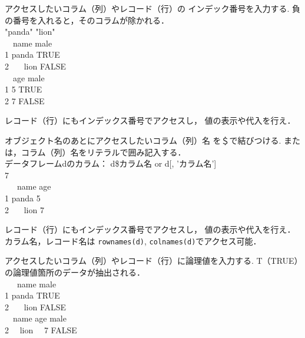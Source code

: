 {
  {
    アクセスしたいコラム（列）やレコード（行）の
    インデック番号を入力する.
    負の番号を入れると，そのコラムが除かれる．
  }
  \MyColsThree
  {
    \MyConsole
    {
      \\ \relax
      [1] "panda" "lion" 
    }
  }
  {
    \MyConsole
    {
      \\ \relax
      ~~name  male\\
      1 panda  TRUE\\
      2 ~~~lion FALSE
    }
  }
  {
    \MyConsole
    {
      \\ \relax
      ~~age  male\\
      1   5  TRUE\\
      2   7 FALSE
    }
  }
}

{
  \MyExercise
  {
    レコード（行）にもインデックス番号でアクセスし，
    値の表示や代入を行え．
  }
}

{
  {
    オブジェクト名のあとにアクセスしたいコラム（列）名
    を＄で結びつける.
    または，コラム（列）名をリテラルで囲み記入する．\\
    データフレームdのカラム： d\$カラム名 or d[, 'カラム名']
  }
  \MyCols
  {
    \MyConsole
    {
      \\  7
    }
  }
  {
    \MyConsole
    {
      \\
      ~~~name age\\
        1 panda   5\\
        2 ~~~lion   7
    }
  }
}

{
  \MyExercise
  {
    レコード（行）にもインデックス番号でアクセスし，
    値の表示や代入を行え．
    カラム名，レコード名は
    \texttt{rownames(d)}, \texttt{colnames(d)}でアクセス可能．
  }
}

{
  {
    アクセスしたいコラム（列）やレコード（行）に論理値を入力する.
    T（TRUE）の論理値箇所のデータが抽出される．
  }
  \MyCols
  {
    \MyConsole
    {
      \\
          ~~~name  male\\
        1 panda  TRUE\\
        2 ~~~lion FALSE
    }
  }
  {
    \MyConsole
    {
      \\
       ~~name age  male\\
       2 ~~lion ~~7 FALSE
    }
  }
}

